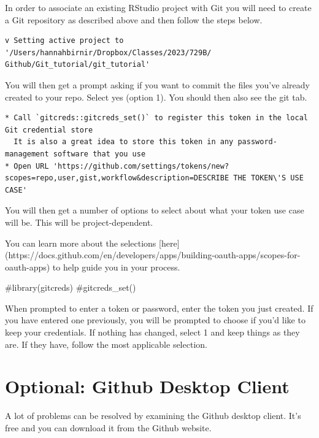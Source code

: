 \documentclass[
  letterpaper,
  DIV=11,
  numbers=noendperiod]{scrartcl}
\newenvironment{Shaded}{\begin{snugshade}}{\end{snugshade}}
\newcommand{\CommentTok}[1]{\textcolor[rgb]{0.37,0.37,0.37}{#1}}
\begin{document}
In order to associate an existing RStudio project with Git you will need
to create a Git repository as described above and then follow the steps
below.

\begin{verbatim}
v Setting active project to '/Users/hannahbirnir/Dropbox/Classes/2023/729B/
Github/Git_tutorial/git_tutorial'
\end{verbatim}

You will then get a prompt asking if you want to commit the files you've
already created to your repo. Select yes (option 1). You should then
also see the git tab.

\begin{verbatim}
* Call `gitcreds::gitcreds_set()` to register this token in the local Git credential store
  It is also a great idea to store this token in any password-management software that you use
* Open URL 'https://github.com/settings/tokens/new?scopes=repo,user,gist,workflow&description=DESCRIBE THE TOKEN\'S USE CASE'
\end{verbatim}

You will then get a number of options to select about what your token
use case will be. This will be project-dependent.

You can learn more about the selections
{[}here{]}(https://docs.github.com/en/developers/apps/building-oauth-apps/scopes-for-oauth-apps)
to help guide you in your process.

\begin{Shaded}
\begin{Highlighting}[]
\CommentTok{\#library(gitcreds) }
\CommentTok{\#gitcreds\_set()}
\end{Highlighting}
\end{Shaded}

When prompted to enter a token or password, enter the token you just
created. If you have entered one previously, you will be prompted to
choose if you'd like to keep your credentials. If nothing has changed,
select 1 and keep things as they are. If they have, follow the most
applicable selection.

\hypertarget{optional-github-desktop-client}{%
\section{Optional: Github Desktop
Client}\label{optional-github-desktop-client}}

A lot of problems can be resolved by examining the Github desktop
client. It's free and you can download it from the Github website.
\end{document}

